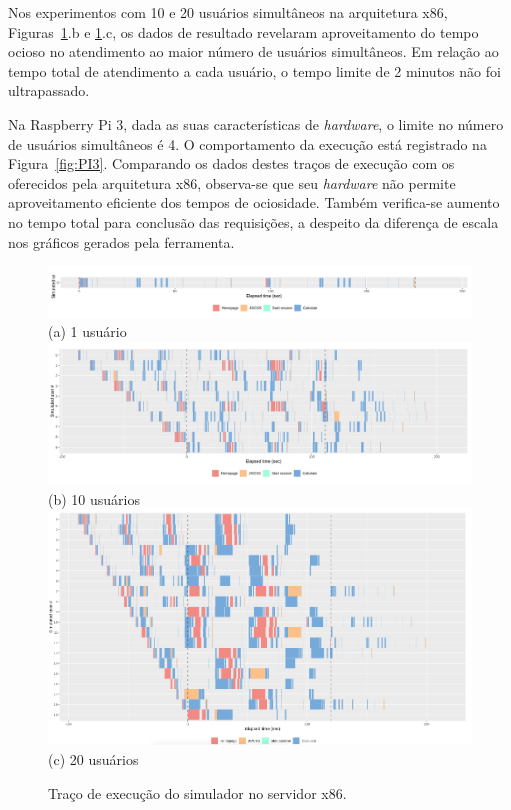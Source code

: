 \documentclass[12pt,english,brazil]{article}
\begin{document}
Nos experimentos com 10 e 20 usuários simultâneos na arquitetura x86, Figuras~\ref{fig:x64}.b e \ref{fig:x64}.c, os dados de resultado revelaram aproveitamento do tempo ocioso no atendimento ao maior número de usuários simultâneos. Em relação ao tempo total de atendimento a cada usuário, o tempo limite de 2 minutos não foi ultrapassado.

Na Raspberry Pi 3, dada as suas características de \emph{hardware}, o limite no número de usuários simultâneos é 4. O comportamento da execução está registrado na Figura~\ref{fig:PI3}. Comparando os dados destes traços de execução com os oferecidos pela arquitetura x86, observa-se que seu \emph{hardware} não permite aproveitamento eficiente dos tempos de ociosidade. Também verifica-se aumento no tempo total para conclusão das requisições, a despeito da diferença de escala nos gráficos gerados pela ferramenta.

\begin{figure}[htbp]
  \centering 
  \includegraphics[scale=.4]{paperWSCAD2021/figures/user_x64_1_worker.png}\\(a) 1 usuário
    \includegraphics[scale=.4]{paperWSCAD2021/figures/user_x64_10_worker.png}\\(b) 10 usuários
  \includegraphics[scale=.4]{paperWSCAD2021/figures/user_x64_20_worker.jpg}\\(c) 20 usuários
\caption{Traço de execução do simulador no servidor x86.}
  \label{fig:x64}
\end{figure}
\end{document}
